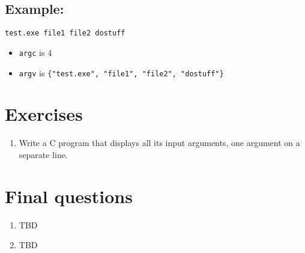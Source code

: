 \documentclass[12pt,]{scrartcl}
\providecommand{\tightlist}{%
  \setlength{\itemsep}{0pt}\setlength{\parskip}{0pt}}
\begin{document}
\subsection{Example:}\label{example}

\texttt{test.exe\ file1\ file2\ dostuff}

\begin{itemize}
\tightlist
\item
  \texttt{argc} is 4
\item
  \texttt{argv} is
  \texttt{\{"test.exe",\ "file1",\ "file2",\ "dostuff"\}}
\end{itemize}

\section{Exercises}\label{exercises}

\begin{enumerate}
\def\labelenumi{\arabic{enumi}.}
\tightlist
\item
  Write a C program that displays all its input arguments, one argument
  on a separate line.
\end{enumerate}

\section{Final questions}\label{final-questions}

\begin{enumerate}
\def\labelenumi{\arabic{enumi}.}
\tightlist
\item
  TBD
\item
  TBD
\end{enumerate}
\end{document}
